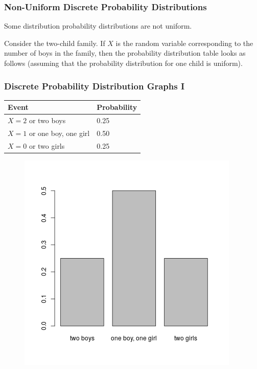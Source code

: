 \documentclass[xcolor=dvipsnames]{beamer}
\begin{document}
\begin{frame}
  \frametitle{Non-Uniform Discrete Probability Distributions}
  Some distribution probability distributions are not uniform.

\bigskip

  \label{ex:shaisail} Consider the
  two-child family. If $X$ is the random variable corresponding to the
  number of boys in the family, then the probability distribution
  table looks as follows (assuming that the probability distribution
  for one child is uniform).
\end{frame}

\begin{frame}
  \frametitle{Discrete Probability Distribution Graphs I}
\begin{tabular}{|l|l|}\hline
  Event & Probability \\ \hline
  $X=2$ or two boys & 0.25 \\ \hline
  $X=1$ or one boy, one girl & 0.50 \\ \hline
  $X=0$ or two girls & 0.25 \\ \hline
\end{tabular}

\bigskip

\begin{figure}[h]
\includegraphics[scale=.45]{./diagrams/boys.png}
\end{figure}
\end{frame}
\end{document}
